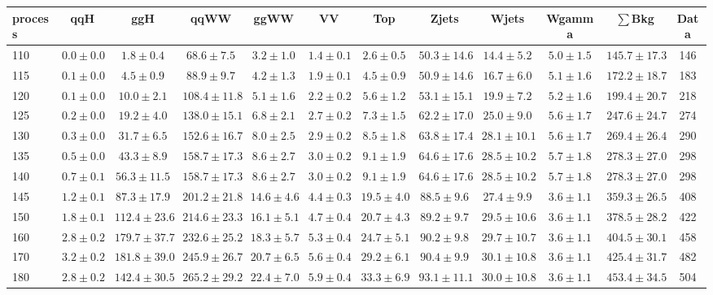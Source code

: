 \begin{table}[!htb]
{ \tiny
 \begin{center}
 \begin{tabular}{l | c c | c c c c c c c | c c}
 \hline
 process & qqH & ggH & qqWW & ggWW & VV & Top & Zjets & Wjets & Wgamma & $\sum$Bkg & Data \\
 \hline
110 & $0.0\pm0.0$ & $1.8\pm0.4$ & $68.6\pm7.5$ & $3.2\pm1.0$ & $1.4\pm0.1$ & $2.6\pm0.5$ & $50.3\pm14.6$ & $14.4\pm5.2$ & $5.0\pm1.5$ & $145.7\pm17.3$ & 146 \\
115 & $0.1\pm0.0$ & $4.5\pm0.9$ & $88.9\pm9.7$ & $4.2\pm1.3$ & $1.9\pm0.1$ & $4.5\pm0.9$ & $50.9\pm14.6$ & $16.7\pm6.0$ & $5.1\pm1.6$ & $172.2\pm18.7$ & 183 \\
120 & $0.1\pm0.0$ & $10.0\pm2.1$ & $108.4\pm11.8$ & $5.1\pm1.6$ & $2.2\pm0.2$ & $5.6\pm1.2$ & $53.1\pm15.1$ & $19.9\pm7.2$ & $5.2\pm1.6$ & $199.4\pm20.7$ & 218 \\
125 & $0.2\pm0.0$ & $19.2\pm4.0$ & $138.0\pm15.1$ & $6.8\pm2.1$ & $2.7\pm0.2$ & $7.3\pm1.5$ & $62.2\pm17.0$ & $25.0\pm9.0$ & $5.6\pm1.7$ & $247.6\pm24.7$ & 274 \\
130 & $0.3\pm0.0$ & $31.7\pm6.5$ & $152.6\pm16.7$ & $8.0\pm2.5$ & $2.9\pm0.2$ & $8.5\pm1.8$ & $63.8\pm17.4$ & $28.1\pm10.1$ & $5.6\pm1.7$ & $269.4\pm26.4$ & 290 \\
135 & $0.5\pm0.0$ & $43.3\pm8.9$ & $158.7\pm17.3$ & $8.6\pm2.7$ & $3.0\pm0.2$ & $9.1\pm1.9$ & $64.6\pm17.6$ & $28.5\pm10.2$ & $5.7\pm1.8$ & $278.3\pm27.0$ & 298 \\
140 & $0.7\pm0.1$ & $56.3\pm11.5$ & $158.7\pm17.3$ & $8.6\pm2.7$ & $3.0\pm0.2$ & $9.1\pm1.9$ & $64.6\pm17.6$ & $28.5\pm10.2$ & $5.7\pm1.8$ & $278.3\pm27.0$ & 298 \\
145 & $1.2\pm0.1$ & $87.3\pm17.9$ & $201.2\pm21.8$ & $14.6\pm4.6$ & $4.4\pm0.3$ & $19.5\pm4.0$ & $88.5\pm9.6$ & $27.4\pm9.9$ & $3.6\pm1.1$ & $359.3\pm26.5$ & 408 \\
150 & $1.8\pm0.1$ & $112.4\pm23.6$ & $214.6\pm23.3$ & $16.1\pm5.1$ & $4.7\pm0.4$ & $20.7\pm4.3$ & $89.2\pm9.7$ & $29.5\pm10.6$ & $3.6\pm1.1$ & $378.5\pm28.2$ & 422 \\
160 & $2.8\pm0.2$ & $179.7\pm37.7$ & $232.6\pm25.2$ & $18.3\pm5.7$ & $5.3\pm0.4$ & $24.7\pm5.1$ & $90.2\pm9.8$ & $29.7\pm10.7$ & $3.6\pm1.1$ & $404.5\pm30.1$ & 458 \\
170 & $3.2\pm0.2$ & $181.8\pm39.0$ & $245.9\pm26.7$ & $20.7\pm6.5$ & $5.6\pm0.4$ & $29.2\pm6.1$ & $90.4\pm9.9$ & $30.1\pm10.8$ & $3.6\pm1.1$ & $425.4\pm31.7$ & 482 \\
180 & $2.8\pm0.2$ & $142.4\pm30.5$ & $265.2\pm29.2$ & $22.4\pm7.0$ & $5.9\pm0.4$ & $33.3\pm6.9$ & $93.1\pm11.1$ & $30.0\pm10.8$ & $3.6\pm1.1$ & $453.4\pm34.5$ & 504 \\

\end{tabular}
\end{center}}
\end{table}
